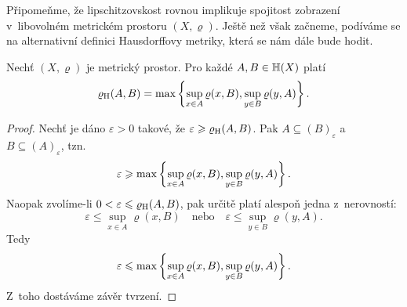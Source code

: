 Připomeňme, že lipschitzovskost rovnou implikuje spojitost zobrazení v~libovolném metrickém prostoru $(X,\varrho)$. Ještě než však začneme, podíváme se na alternativní definici Hausdorffovy metriky, která se nám dále bude hodit.
\begin{theorem}\label{thm:alternativni-hausdorffova-metrika}
    Nechť $(X,\varrho)$ je metrický prostor. Pro každé $A,B\in\mathbb{H}(X)$ platí
    \[\varrho_\textup{H}(A,B)=\max\left\{\sup_{x\in A}\varrho(x,B),\sup_{y\in B}\varrho(y,A)\right\}.\]
\end{theorem}
\begin{proof}
    Nechť je dáno $\varepsilon>0$ takové, že $\varepsilon\geqslant\varrho_\textup{H}(A,B)$. Pak $A\subseteq(B)_\varepsilon$ a~$B\subseteq(A)_\varepsilon$, tzn.
    \[\varepsilon\geqslant\max\left\{\sup_{x\in A}\varrho(x,B),\sup_{y\in B}\varrho(y,A)\right\}.\]
    Naopak zvolíme-li $0<\varepsilon\leqslant\varrho_\textup{H}(A,B)$, pak určitě platí alespoň jedna z~nerovností:
    \[\varepsilon\leqslant\sup_{x\in A}\varrho(x,B)\quad\text{nebo}\quad\varepsilon\leqslant\sup_{y\in B}\varrho(y,A).\]
    Tedy
    \[\varepsilon\leqslant\max\left\{\sup_{x\in A}\varrho(x,B),\sup_{y\in B}\varrho(y,A)\right\}.\]
    Z~toho dostáváme závěr tvrzení.
\end{proof}

